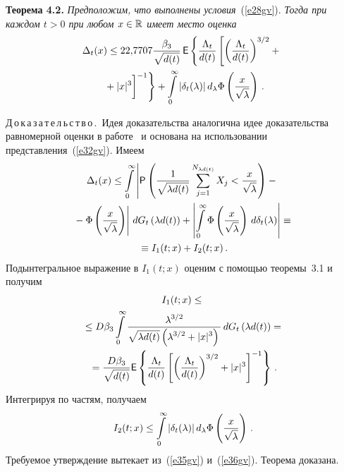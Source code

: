 \begin{multicols}{2}
\smallskip

\noindent
\textbf{Теорема 4.2.} \textit{Предположим, что выполнены условия}~(\ref{e28gv}).
\textit{Тогда при каждом $t>0$ при любом $x\in\mathbb R$ имеет место оценка}
\begin{multline}
\Delta_t(x)\le 22{,}7707\fr{\beta_3}{\sqrt{d(t)}}\,{\sf
E}\left\{\fr{\Lambda_t}{d(t)}\left[\left(\fr{\Lambda_t}{d(t)}\right)^{3/2}+{}\right.\right.\\
\left.\left.{}+|x|^3
\vphantom{\fr{\Lambda_t}{d(t)}}\right]^{-1}\right\}+
\int\limits_0^{\infty}|\delta_t(\lambda)|\,d_{\lambda}\Phi\left(\fr{x}{\sqrt{\lambda}}\right)\,.\label{e34gv}
\end{multline}

\smallskip

\noindent
Д\,о\,к\,а\,з\,а\,т\,е\,л\,ь\,с\,т\,в\,о\,.\ Идея доказательства аналогична идее
доказательства равномерной оценки в работе~\cite{Gavrilenko} и основана на использовании
представления~(\ref{e32gv}). Имеем
\begin{multline*}
\Delta_t(x)\le\int\limits_0^{\infty}\left|{\sf
P}\left(\displaystyle\frac{\displaystyle 1\mathstrut}{\displaystyle \sqrt{\lambda d(t)}\mathstrut}\sum_{j=1}^{N_{\lambda
d(t)}}X_j<\displaystyle\frac{\displaystyle x\mathstrut}{\displaystyle \sqrt{\lambda}\mathstrut}\right)-{}\right.\\
\left.{}-\Phi\left(\displaystyle\frac{\displaystyle x\mathstrut}{\displaystyle \sqrt{\lambda}\mathstrut}\right)\right|\,dG_t\left(\lambda
d(t)\right)+
\left|\int\limits_0^{\infty}\Phi\left(\displaystyle\frac{\displaystyle x\mathstrut}{\displaystyle \sqrt{\lambda}\mathstrut}\right)\,d\delta_t(\lambda)\right|\equiv{}\\
{}\equiv
I_1(t;x)+I_2(t;x)\,.
\end{multline*}
Подынтегральное выражение в $I_1(t;x)$ оценим с помощью теоремы~3.1 и получим
\begin{multline}
I_1(t;x)\le{}\\
{}\le
D\beta_3\int\limits_0^{\infty}\displaystyle\frac{\displaystyle \lambda^{3/2}\mathstrut}{\displaystyle \sqrt{\lambda
d(t)}\left(\lambda^{3/2}+|x|^3\right)\mathstrut}\,dG_t\left(\lambda d(t)\right)={}\\
{}=
\displaystyle\frac{\displaystyle D\beta_3\mathstrut}{\displaystyle \sqrt{d(t)}\mathstrut}{\sf E}\left\{
\displaystyle\frac{\displaystyle \Lambda_t\mathstrut}{\displaystyle d(t)\mathstrut}\left[\left(\displaystyle\frac{\displaystyle \Lambda_t\mathstrut}{\displaystyle d(t)\mathstrut}\right)^{3/2}+|x|^3\right]^{-1}\right\}\,.\label{e35gv}
\end{multline}
Интегрируя по частям, получаем
\begin{equation}
I_2(t;x)\le\int\limits_0^{\infty}|\delta_t(\lambda)|\,d_{\lambda}\Phi\left(\displaystyle\frac{\displaystyle x\mathstrut}{\displaystyle \sqrt{\lambda}\mathstrut}\right)\,.\label{e36gv}
\end{equation}
Требуемое утверждение вытекает из~(\ref{e35gv}) и~(\ref{e36gv}). Тео\-ре\-ма доказана.

\smallskip


\end{multicols}
